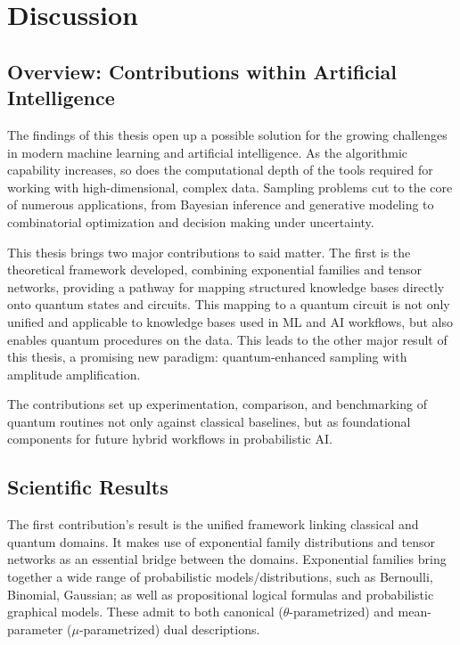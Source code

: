 \documentclass[encoding=utf8,british]{tumphthesis}
\begin{document}
\chapter{Discussion}
\label{chap:Discussion}

    \section{Overview: Contributions within Artificial Intelligence}
    The findings of this thesis open up a possible solution for the growing challenges in modern machine learning and artificial intelligence. As 
    the algorithmic capability increases, so does the computational depth of the tools required for working with high-dimensional, complex data. 
    Sampling problems cut to the core of numerous applications, from Bayesian inference and generative modeling to combinatorial optimization and 
    decision making under uncertainty. 
    
    This thesis brings two major contributions to said matter. The first is the theoretical framework developed, combining exponential 
    families and tensor networks, providing a pathway for mapping structured knowledge bases directly onto quantum states and circuits. This 
    mapping to a quantum circuit is not only unified and applicable to knowledge bases used in ML and AI workflows, but also enables quantum 
    procedures on the data.
    This leads to the other major result of this thesis, a promising new paradigm: quantum-enhanced sampling with amplitude amplification.

    The contributions set up experimentation, comparison, and benchmarking of quantum routines not only against classical baselines, but as 
    foundational components for future hybrid workflows in probabilistic AI.
    
    \section{Scientific Results}
        The first contribution's result is the unified framework linking classical and quantum domains. It makes use of exponential family distributions and tensor networks as an essential bridge 
        between the domains. Exponential families bring together a wide range of probabilistic models/distributions, such as Bernoulli, Binomial, Gaussian; as well as propositional logical 
        formulas and probabilistic graphical models. These admit to both canonical ($\theta$-parametrized) and mean-parameter ($\mu$-parametrized) dual descriptions. 
\end{document}
